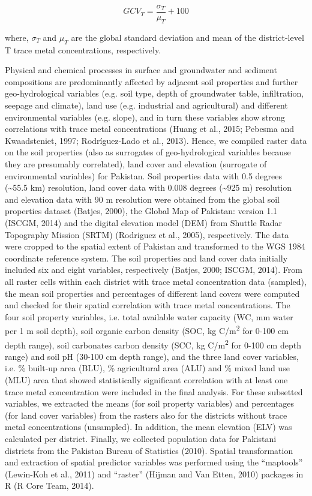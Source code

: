 \begin{equation}
GCV_T=\frac{\sigma_T}{\mu_T}+100
\end{equation}

where, $\sigma_T$ and $\mu_T$ are the global standard deviation and mean of the district-level T trace metal concentrations, respectively.

Physical and chemical processes in surface and groundwater and sediment compositions are predominantly affected by adjacent soil properties and further geo-hydrological variables (e.g. soil type, depth of groundwater table, infiltration, seepage and climate), land use (e.g. industrial and agricultural) and different environmental variables (e.g. slope), and in turn these variables show strong correlations with trace metal concentrations (Huang et al., 2015; Pebesma and Kwaadsteniet, 1997; Rodríguez-Lado et al., 2013). Hence, we compiled raster data on the soil properties (also as surrogates of geo-hydrological variables because they are presumably correlated), land cover and elevation (surrogate of environmental variables) for Pakistan. Soil properties data with 0.5 degrees (\textasciitilde 55.5 km) resolution, land cover data with 0.008 degrees (\textasciitilde 925 m) resolution and elevation data with 90 m resolution were obtained from the global soil properties dataset (Batjes, 2000), the Global Map of Pakistan: version 1.1 (ISCGM, 2014) and the digital elevation model (DEM) from Shuttle Radar Topography Mission (SRTM) (Rodriguez et al., 2005), respectively. The data were cropped to the spatial extent of Pakistan and transformed to the WGS 1984 coordinate reference system. The soil properties and land cover data initially included six and eight variables, respectively (Batjes, 2000; ISCGM, 2014). From all raster cells within each district with trace metal concentration data (sampled), the mean soil properties and percentages of different land covers were computed and checked for their spatial correlation with trace metal concentrations. The four soil property variables, i.e. total available water capacity (WC, mm water per 1 m soil depth), soil organic carbon density (SOC, kg C/m\textsuperscript{2} for 0-100 cm depth range), soil carbonates carbon density (SCC, kg C/m\textsuperscript{2} for 0-100 cm depth range) and soil pH (30-100 cm depth range), and the three land cover variables, i.e. \% built-up area (BLU), \% agricultural area (ALU) and \% mixed land use (MLU) area that showed statistically significant correlation with at least one trace metal concentration were included in the final analysis. For these subsetted variables, we extracted the means (for soil property variables) and percentages (for land cover variables) from the rasters also for the districts without trace metal concentrations (unsampled). In addition, the mean elevation (ELV) was calculated per district. Finally, we collected population data for Pakistani districts from the Pakistan Bureau of Statistics (2010). Spatial transformation and extraction of spatial predictor variables was performed using the “maptools” (Lewin-Koh et al., 2011) and “raster” (Hijman and Van Etten, 2010) packages in R (R Core Team, 2014).

